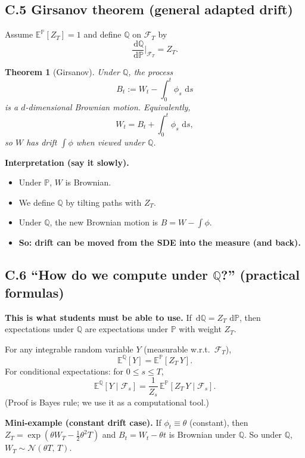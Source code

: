 \documentclass[11pt]{article}
\newcommand{\Pbb}{\mathbb{P}}
\newcommand{\Qbb}{\mathbb{Q}}
\newcommand{\E}{\mathbb{E}}
\newcommand{\dd}{\,\mathrm{d}}
\newcommand{\1}{\mathbf{1}}
\newtheorem{theorem}{Theorem}
\begin{document}
\subsection*{C.5 Girsanov theorem (general adapted drift)}

Assume $\E^{\Pbb}[Z_T]=1$ and define $\Qbb$ on $\mathcal F_T$ by
\[
\frac{\dd\Qbb}{\dd\Pbb}\Big|_{\mathcal F_T}=Z_T.
\]

\begin{theorem}[Girsanov]
Under $\Qbb$, the process
\[
B_t
:=
W_t-\int_0^t \phi_s\,\dd s
\]
is a $d$-dimensional Brownian motion.
Equivalently,
\[
W_t = B_t+\int_0^t \phi_s\,\dd s,
\]
so $W$ has drift $\int \phi$ when viewed under $\Qbb$.
\end{theorem}


\textbf{Interpretation (say it slowly).}
\begin{itemize}[leftmargin=1.4em]
\item Under $\Pbb$, $W$ is Brownian.
\item We define $\Qbb$ by tilting paths with $Z_T$.
\item Under $\Qbb$, the new Brownian motion is $B=W-\int \phi$.
\item \textbf{So: drift can be moved from the SDE into the measure (and back).}
\end{itemize}


\subsection*{C.6 ``How do we compute under $\Qbb$?'' (practical formulas)}


\textbf{This is what students must be able to use.}
If $\dd\Qbb = Z_T\,\dd\Pbb$, then expectations under $\Qbb$
are expectations under $\Pbb$ with weight $Z_T$.


For any integrable random variable $Y$ (measurable w.r.t.\ $\mathcal F_T$),
\[
\boxed{\ \E^{\Qbb}[Y]=\E^{\Pbb}[Z_T\,Y].\ }
\]
For conditional expectations: for $0\le s\le T$,
\[
\boxed{\ \E^{\Qbb}[Y\mid\mathcal F_s]
=
\frac{1}{Z_s}\,\E^{\Pbb}[Z_T\,Y\mid\mathcal F_s].\ }
\]
(Proof is Bayes rule; we use it as a computational tool.)


\textbf{Mini-example (constant drift case).}
If $\phi_t\equiv \theta$ (constant), then
$Z_T=\exp(\theta W_T-\frac12\theta^2T)$ and
$B_t=W_t-\theta t$ is Brownian under $\Qbb$.
So under $\Qbb$, $W_T \sim \mathcal N(\theta T,\,T)$.
\end{document}
